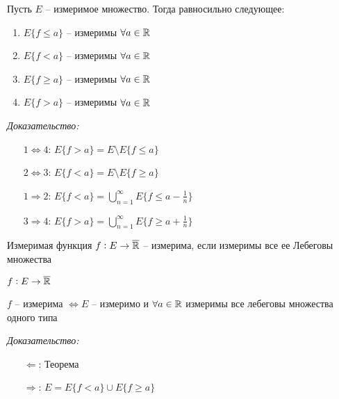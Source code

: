 \documentclass[12pt]{article}
\begin{document}
\begin{theo}{}
    Пусть $E$ -- измеримое множество. Тогда равносильно следующее:

    \begin{enumerate}
        \item $E\{f \leq a\}$ -- измеримы $\forall a \in \mathbb R$
        \item $E\{f < a\}$ -- измеримы $\forall a \in \mathbb R$
        \item $E\{f \geq a\}$ -- измеримы $\forall a \in \mathbb R$
        \item $E\{f > a\}$ -- измеримы $\forall a \in \mathbb R$
    \end{enumerate}
\end{theo}

\textit{Доказательство:}

\begin{itemize}
    \item[$1 \Leftrightarrow 4$: ] $E\{f > a\} = E \setminus E\{f \leq a\}$
    \item[$2 \Leftrightarrow 3$: ] $E\{f < a\} = E \setminus E\{f \geq a\}$
    \item[$1 \Rightarrow 2$: ] $E\{f < a\} = \bigcup\limits_{n = 1}^\infty E\{f \leq a - \frac{1}{n}\}$
    \item[$3 \Rightarrow 4$: ] $E\{f > a\} = \bigcup\limits_{n = 1}^\infty E\{f \geq a + \frac{1}{n}\}$
\end{itemize}

\begin{defin}{Измеримая функция}
    $f : E \to \overline{\mathbb R}$ -- измерима, если измеримы все ее Лебеговы множества
\end{defin}

\begin{Remark}{}
    $f : E \to \overline{\mathbb R}$

    $f$ -- измерима $\Leftrightarrow E$ -- измеримо и $\forall a \in \mathbb R$ измеримы все лебеговы множества одного типа
\end{Remark}

\textit{Доказательство:}

\begin{itemize}
    \item[$\Leftarrow$: ] Теорема 
    \item[$\Rightarrow$: ] $E = E\{f < a\} \cup E\{f \geq a\}$
\end{itemize}
\end{document}
